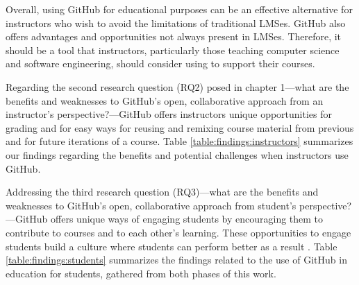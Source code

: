 Overall, using GitHub for educational purposes can be an effective alternative for instructors who wish to avoid the limitations of traditional LMSes\cite{garcia2011opening}. GitHub also offers advantages and opportunities not always present in LMSes. Therefore, it should be a tool that instructors, particularly those teaching computer science and software engineering, should consider using to support their courses.

Regarding the second research question (RQ2) posed in chapter 1---what are the benefits and weaknesses to GitHub's open, collaborative approach from an instructor's perspective?---GitHub offers instructors unique opportunities for grading and for easy ways for reusing and remixing course material from previous and for future iterations of a course. Table \ref{table:findings:instructors} summarizes our findings regarding the benefits and potential challenges when instructors use GitHub.

Addressing the third research question (RQ3)---what are the benefits and weaknesses to GitHub's open, collaborative approach from student's perspective?---GitHub offers unique ways of engaging students by encouraging them to contribute to courses and to each other's learning. These opportunities to engage students build a culture where students can perform better as a result \cite{kuh2001assessing}. Table \ref{table:findings:students} summarizes the findings related to the use of GitHub in education for students, gathered from both phases of this work.

